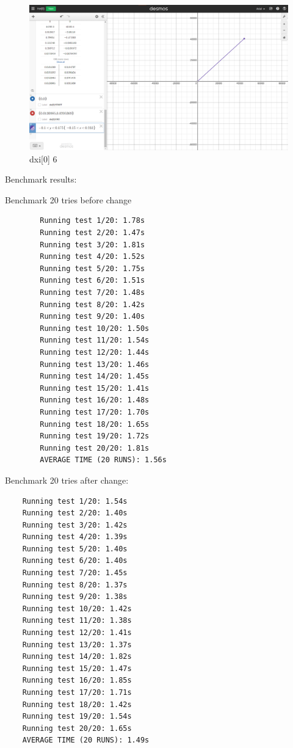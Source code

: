 \begin{figure}[H]
    \includegraphics[width=\columnwidth]{figs/dxi[0]_6}
    \caption{dxi[0] 6}
\end{figure}

Benchmark results:

Benchmark 20 tries before change
\footnotesize\begin{verbatim}
        Running test 1/20: 1.78s
        Running test 2/20: 1.47s
        Running test 3/20: 1.81s
        Running test 4/20: 1.52s
        Running test 5/20: 1.75s
        Running test 6/20: 1.51s
        Running test 7/20: 1.48s
        Running test 8/20: 1.42s
        Running test 9/20: 1.40s
        Running test 10/20: 1.50s
        Running test 11/20: 1.54s
        Running test 12/20: 1.44s
        Running test 13/20: 1.46s
        Running test 14/20: 1.45s
        Running test 15/20: 1.41s
        Running test 16/20: 1.48s
        Running test 17/20: 1.70s
        Running test 18/20: 1.65s
        Running test 19/20: 1.72s
        Running test 20/20: 1.81s
        AVERAGE TIME (20 RUNS): 1.56s
\end{verbatim}
\normalsize

Benchmark 20 tries after change:
\footnotesize\begin{verbatim}
    Running test 1/20: 1.54s
    Running test 2/20: 1.40s
    Running test 3/20: 1.42s
    Running test 4/20: 1.39s
    Running test 5/20: 1.40s
    Running test 6/20: 1.40s
    Running test 7/20: 1.45s
    Running test 8/20: 1.37s
    Running test 9/20: 1.38s
    Running test 10/20: 1.42s
    Running test 11/20: 1.38s
    Running test 12/20: 1.41s
    Running test 13/20: 1.37s
    Running test 14/20: 1.82s
    Running test 15/20: 1.47s
    Running test 16/20: 1.85s
    Running test 17/20: 1.71s
    Running test 18/20: 1.42s
    Running test 19/20: 1.54s
    Running test 20/20: 1.65s
    AVERAGE TIME (20 RUNS): 1.49s
\end{verbatim}
\normalsize

